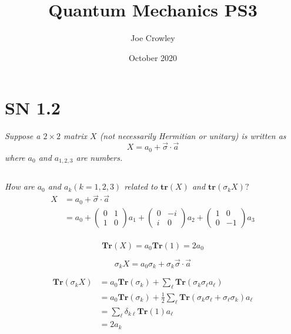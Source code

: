 \documentclass{article}
\title{Quantum Mechanics PS3}
\author{Joe Crowley}
\date{October 2020}
\begin{document}
  

\section{SN 1.2}
\textit{Suppose a $2 \times 2$ matrix $X$ (not necessarily Hermitian or unitary) is written as
$$
X=a_{0}+\vec{\sigma} \cdot \vec{a}
$$
where $a_{0}$ and $a_{1,2,3}$ are numbers.}
\subsection{}
\textit{How are $a_{0}$ and $a_{k}(k=1,2,3)$ related to $\mathbf{tr}(X)$ and $\mathbf{tr}\left(\sigma_{k} X\right) ?$}
\begin{align*}
    X&=a_{0}+\vec{\sigma} \cdot \vec{a}\\
    &=a_{0}+\left(\begin{array}{ll}
0 & 1 \\
1 & 0
\end{array}\right) a_{1}+\left(\begin{array}{cc}
0 & -i \\
i & 0
\end{array}\right) a_{2}+\left(\begin{array}{cc}
1 & 0 \\
0 & -1
\end{array}\right) a_{3}\\
\end{align*}

\begin{equation*}
     \mathbf{Tr}(X)=a_{0} \mathbf{Tr}(1)=2 a_{0}
\end{equation*}

\begin{equation*}
    \sigma_{k} X=a_{0} \sigma_{k}+\sigma_{k} \vec{\sigma} \cdot \vec{a}
\end{equation*}


\begin{align*}
    \mathbf{Tr}\left(\sigma_{k} X\right)&=a_{0} \mathbf{Tr}\left(\sigma_{k}\right)+\sum_{\ell} \mathbf{Tr}\left(\sigma_{k} \sigma_{\ell} a_{\ell}\right)\\
    &=a_{0} \mathbf{Tr}\left(\sigma_{k}\right)+\frac{1}{2} \sum_{\ell} \mathbf{Tr}\left(\sigma_{k} \sigma_{\ell}+\sigma_{\ell} \sigma_{k}\right) a_{\ell}\\
    &=\sum_{\ell} \delta_{k \ell} \mathbf{Tr}(1) a_{\ell}\\
    &= 2 a_{k}
\end{align*}
\end{document}
